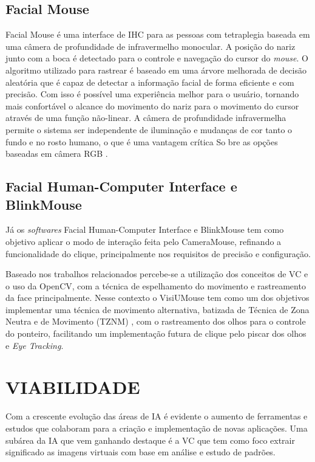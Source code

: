 \subsection{Facial Mouse}

Facial Mouse é uma interface de IHC para as pessoas com tetraplegia baseada em uma câmera de profundidade de infravermelho monocular. A posição do nariz junto com a boca é detectado para o controle e navegação do cursor do \textit{mouse}. O algoritmo utilizado para rastrear é baseado em uma árvore melhorada de decisão aleatória que é capaz de detectar a informação facial de forma eficiente e com precisão. Com isso é possível uma experiência melhor para o usuário, tornando mais confortável o alcance do movimento do nariz para o movimento do cursor através de uma função não-linear. A câmera de profundidade infravermelha permite o sistema ser independente de iluminação e mudanças de cor tanto o fundo e no rosto humano, o que é uma vantagem crítica
So  bre as opções baseadas em câmera RGB .

\subsection{Facial Human-Computer Interface e BlinkMouse}
Já os \textit{softwares} Facial Human-Computer Interface  e BlinkMouse  tem como objetivo aplicar o modo de interação feita pelo CameraMouse, refinando a funcionalidade do clique, principalmente nos requisitos de precisão e configuração.

Baseado nos trabalhos relacionados percebe-se a utilização dos conceitos de VC e o uso da OpenCV, com a técnica de espelhamento do movimento e rastreamento da face principalmente. Nesse contexto o VisiUMouse tem como um dos objetivos implementar uma técnica de movimento alternativa, batizada de Técnica de Zona Neutra e de Movimento (TZNM) , com o rastreamento dos olhos para o controle do ponteiro, facilitando  um implementação futura de clique pelo piscar dos olhos e \textit{Eye Tracking}.

\section{VIABILIDADE}\label{Sub:viabilidade}
Com a crescente evolução das áreas de IA é evidente o aumento de ferramentas e estudos que colaboram para a criação e implementação de novas aplicações. Uma subárea da IA que vem ganhando destaque é a VC que tem como foco extrair significado as imagens virtuais com base em análise e estudo de padrões.


